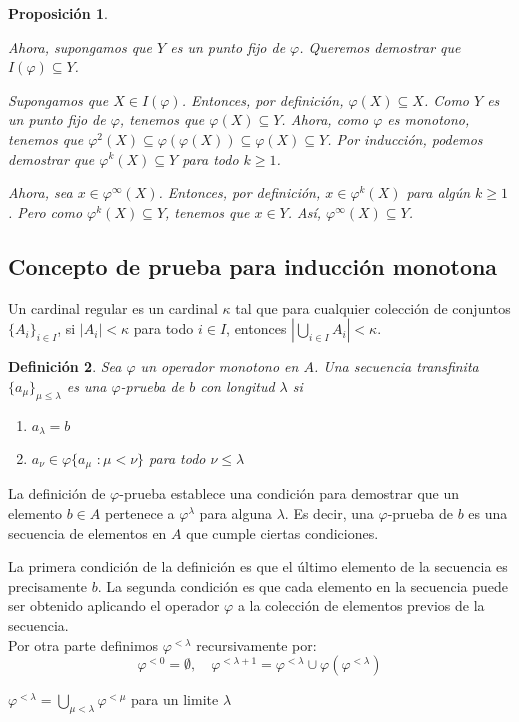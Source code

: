 \documentclass[executivepaper]{article}
\newtheorem{propo}{Proposición}[section]
\newtheorem{defi}[propo]{Definición}
\begin{document}
\begin{propo}
\begin{enumerate}
    Ahora, supongamos que $Y$ es un punto fijo de $\varphi$. Queremos demostrar que $I(\varphi)\subseteq Y$.
    
    Supongamos que $X\in I(\varphi)$. Entonces, por definición, $\varphi(X)\subseteq X$. Como $Y$ es un punto fijo de $\varphi$, tenemos que $\varphi(X)\subseteq Y$. Ahora, como $\varphi$ es monotono, tenemos que $\varphi^2(X)\subseteq \varphi(\varphi(X))\subseteq \varphi(X)\subseteq Y$. Por inducción, podemos demostrar que $\varphi^k(X)\subseteq Y$ para todo $k\geq 1$.
    
    Ahora, sea $x\in \varphi^\infty(X)$. Entonces, por definición, $x\in \varphi^k(X)$ para algún $k\geq 1$. Pero como $\varphi^k(X)\subseteq Y$, tenemos que $x\in Y$. Así, $\varphi^\infty(X)\subseteq Y$.
\end{enumerate}
\end{propo}
\subsection{Concepto de prueba para inducción monotona}
Un cardinal regular es un cardinal $\kappa$ tal que para cualquier colección de conjuntos $\{A_i\}_{i\in I}$, si $\vert A_i \vert < \kappa$ para todo $i\in I$, entonces $\left\vert \bigcup_{i\in I} A_i \right\vert < \kappa$.

\begin{defi}
    Sea $\varphi$ un operador monotono en $A$. Una secuencia transfinita $\{a_{\mu}\}_{\mu\leq\lambda}$ es una $\varphi$-prueba de $b$ con longitud $\lambda$ si 
    \begin{enumerate}
        \item $a_{\lambda} =b$
        \item $a_{\nu}\in\varphi\{a_{\mu}\,\,:\mu<\nu\}$ para todo $\nu\leq\lambda$
    \end{enumerate}
\end{defi}
La definición de $\varphi$-prueba establece una condición para demostrar que un elemento $b\in A$ pertenece a $\varphi^\lambda$ para alguna $\lambda$. Es decir, una $\varphi$-prueba de $b$ es una secuencia de elementos en $A$ que cumple ciertas condiciones.

La primera condición de la definición es que el último elemento de la secuencia es precisamente $b$. La segunda condición es que cada elemento en la secuencia puede ser obtenido aplicando el operador $\varphi$ a la colección de elementos previos de la secuencia.\\

Por otra parte definimos $\varphi^{<\lambda}$ recursivamente por:
$$\varphi^{<0} = \emptyset, \,\,\,\,\,\, \varphi^{<\lambda + 1} = \varphi^{<\lambda} \cup \varphi(\varphi^{<\lambda})$$
\begin{center}
    $\varphi^{<\lambda} = \bigcup_{\mu<\lambda} \varphi^{<\mu}$ para un limite $\lambda$
\end{center}
\end{document}
